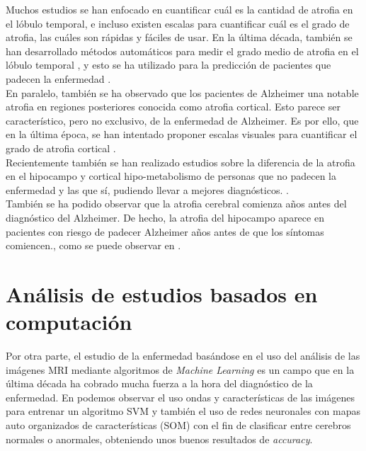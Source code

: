 Muchos estudios se han enfocado en cuantificar cuál es la cantidad de atrofia en el lóbulo temporal, e incluso existen escalas para cuantificar cuál es el grado de atrofia, las cuáles son rápidas y fáciles de usar. En la última década, también se han desarrollado métodos automáticos para medir el grado medio de atrofia en el lóbulo temporal \cite{Hattori2007}, y esto se ha utilizado para la predicción de pacientes que padecen la enfermedad \cite{Visser491}.\\

En paralelo, también se ha observado que los pacientes de Alzheimer una notable atrofia en regiones posteriores conocida como atrofia cortical. Esto parece ser característico, pero no exclusivo, de la enfermedad de Alzheimer. Es por ello, que en la última época, se han intentado proponer escalas visuales para cuantificar el grado de atrofia cortical \cite{Koedam2011}.\\

Recientemente también se han realizado estudios sobre la diferencia de la atrofia en el hipocampo y cortical hipo-metabolismo de personas que no padecen la enfermedad y las que sí, pudiendo llevar a mejores diagnósticos. \cite{Chung2017}.\\

También se ha podido observar que la atrofia cerebral comienza años antes del diagnóstico del Alzheimer. De hecho, la atrofia del hipocampo aparece en pacientes con riesgo de padecer Alzheimer años antes de que los síntomas comiencen., como se puede observar en \cite{fox1996presymptomatic}.\\

\section{Análisis de estudios basados en computación}

Por otra parte, el estudio de la enfermedad basándose en el uso del análisis de las imágenes MRI mediante algoritmos de \textit{Machine Learning} es un campo que en la última década ha cobrado mucha fuerza a la hora del diagnóstico de la enfermedad. En \cite{CHAPLOT200686} podemos observar el uso ondas y características de las imágenes para entrenar un algoritmo SVM  y también el uso de redes neuronales con mapas auto organizados de características (SOM) con el fin de clasificar entre cerebros normales o anormales, obteniendo unos buenos resultados de \textit{accuracy}.\\

